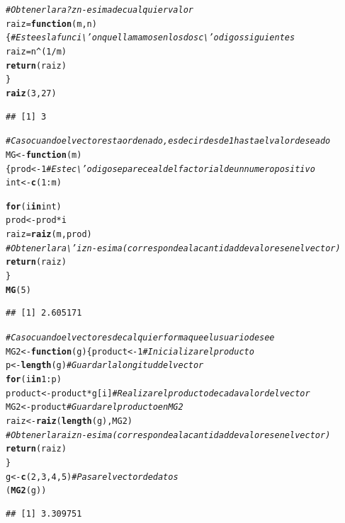 \documentclass[12pt,letterpaper]{article}\usepackage[]{graphicx}\usepackage[]{color}
\makeatletter
\newcommand{\hlnum}[1]{\textcolor[rgb]{0.686,0.059,0.569}{#1}}%
\newcommand{\hlcom}[1]{\textcolor[rgb]{0.678,0.584,0.686}{\textit{#1}}}%
\newcommand{\hlopt}[1]{\textcolor[rgb]{0,0,0}{#1}}%
\newcommand{\hlstd}[1]{\textcolor[rgb]{0.345,0.345,0.345}{#1}}%
\newcommand{\hlkwa}[1]{\textcolor[rgb]{0.161,0.373,0.58}{\textbf{#1}}}%
\newcommand{\hlkwb}[1]{\textcolor[rgb]{0.69,0.353,0.396}{#1}}%
\newcommand{\hlkwc}[1]{\textcolor[rgb]{0.333,0.667,0.333}{#1}}%
\newcommand{\hlkwd}[1]{\textcolor[rgb]{0.737,0.353,0.396}{\textbf{#1}}}%
\newenvironment{kframe}{%
 \def\at@end@of@kframe{}%
 \ifinner\ifhmode%
  \def\at@end@of@kframe{\end{minipage}}%
  \begin{minipage}{\columnwidth}%
 \fi\fi%
 \def\FrameCommand##1{\hskip\@totalleftmargin \hskip-\fboxsep
 \colorbox{shadecolor}{##1}\hskip-\fboxsep
     \hskip-\linewidth \hskip-\@totalleftmargin \hskip\columnwidth}%
 \MakeFramed {\advance\hsize-\width
   \@totalleftmargin\z@ \linewidth\hsize
   \@setminipage}}%
 {\par\unskip\endMakeFramed%
 \at@end@of@kframe}
\newenvironment{knitrout}{}{} %
\makeatother
\begin{document}
\begin{knitrout}
\color{fgcolor}\begin{kframe}
\begin{alltt}
\hlcom{# Obtener la ra?z n-esima de cualquier valor }
\hlstd{raiz}\hlkwb{=}\hlkwa{function}\hlstd{(}\hlkwc{m}\hlstd{,}\hlkwc{n}\hlstd{)\{} \hlcom{# Este es la funci\textbackslash{}'on que llamamos en los dos c\textbackslash{}'odigos siguientes}
  \hlstd{raiz}\hlkwb{=}\hlstd{n}\hlopt{^}\hlstd{(}\hlnum{1}\hlopt{/}\hlstd{m)}
  \hlkwd{return}\hlstd{(raiz)}
\hlstd{\}}
\hlkwd{raiz}\hlstd{(}\hlnum{3}\hlstd{,}\hlnum{27}\hlstd{)}
\end{alltt}
\begin{verbatim}
## [1] 3
\end{verbatim}
\begin{alltt}
\hlcom{# Caso cuando el vector esta ordenado, es decir desde 1 hasta el valor deseado}
\hlstd{MG}\hlkwb{<-}\hlkwa{function}\hlstd{(}\hlkwc{m}\hlstd{)}
  \hlstd{\{prod}\hlkwb{<-}\hlnum{1} \hlcom{# Este c\textbackslash{}'odigo se parece al del factorial de un numero positivo}
  \hlstd{int}\hlkwb{<-}\hlkwd{c}\hlstd{(}\hlnum{1}\hlopt{:}\hlstd{m)}

  \hlkwa{for}\hlstd{(i} \hlkwa{in} \hlstd{int)}
    \hlstd{prod}\hlkwb{<-}\hlstd{prod} \hlopt{*} \hlstd{i}
  \hlstd{raiz}\hlkwb{=}\hlkwd{raiz}\hlstd{(m,prod)}
  \hlcom{# Obtener la ra\textbackslash{}'iz n-esima (corresponde a la cantidad de valores en el vector)}
  \hlkwd{return}\hlstd{(raiz)}
  \hlstd{\}}
\hlkwd{MG}\hlstd{(}\hlnum{5}\hlstd{)}
\end{alltt}
\begin{verbatim}
## [1] 2.605171
\end{verbatim}
\begin{alltt}
\hlcom{# Caso cuando el vector es de calquier forma que el usuario desee}
\hlstd{MG2}\hlkwb{<-}\hlkwa{function}\hlstd{(}\hlkwc{g}\hlstd{) \{product}\hlkwb{<-}\hlnum{1} \hlcom{# Inicializar el producto}
  \hlstd{p}\hlkwb{<-} \hlkwd{length}\hlstd{(g)} \hlcom{# Guardar la longitud del vector}
  \hlkwa{for}\hlstd{(i} \hlkwa{in} \hlnum{1}\hlopt{:}\hlstd{p)}
    \hlstd{product}\hlkwb{<-}\hlstd{product} \hlopt{*} \hlstd{g[i]} \hlcom{# Realizar el producto de cada valor del vector}
  \hlstd{MG2}\hlkwb{<-}\hlstd{product} \hlcom{# Guardar el producto en MG2}
  \hlstd{raiz}\hlkwb{<-}\hlkwd{raiz}\hlstd{(}\hlkwd{length}\hlstd{(g),MG2)}
  \hlcom{# Obtener la raiz n-esima (corresponde a la cantidad de valores en el vector)}
  \hlkwd{return}\hlstd{(raiz)}
\hlstd{\}}
\hlstd{g}\hlkwb{<-}\hlkwd{c}\hlstd{(}\hlnum{2}\hlstd{,}\hlnum{3}\hlstd{,}\hlnum{4}\hlstd{,}\hlnum{5}\hlstd{)} \hlcom{# Pasar el vector de datos}
\hlstd{(}\hlkwd{MG2}\hlstd{(g))}
\end{alltt}
\begin{verbatim}
## [1] 3.309751
\end{verbatim}
\end{kframe}
\end{knitrout}
\end{document}
